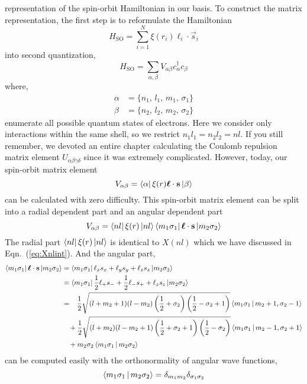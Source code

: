 representation of the spin-orbit Hamiltonian in our basis.
To construct the matrix representation, the first step is to reformulate the Hamiltonian
\begin{equation}
H_\text{SO} = \sum_{i=1}^N \xi(r_i) \boldsymbol{\ell}_i\cdot\vec{s}_i
\end{equation}
into second quantization,
\begin{equation} \label{eq:SO2nd}
H_\text{SO} = \sum_{\alpha,\beta} V_{\alpha\beta} c_\alpha^\dagger c_\beta
\end{equation}
where,
\begin{align*}
\alpha & = \{n_1,\,l_1,\,m_1,\,\sigma_1\} \\
\beta  & = \{n_2,\,l_2,\,m_2,\,\sigma_2\}
\end{align*}
enumerate all possible quantum states of electrons. Here we consider only
interactions within the same shell, so we restrict $n_1l_1=n_2l_2=nl$.
If you still remember, we devoted an entire chapter
calculating the Coulomb repulsion matrix element $U_{\alpha\beta\gamma\delta}$
since it was extremely complicated.
However, today, our spin-orbit matrix element
\begin{equation}
V_{\alpha\beta} = \Bra{\alpha} \xi(r) \boldsymbol{\ell}\cdot\vec{s} \Ket{\beta}
\end{equation}
can be calculated with zero difficulty.
This spin-orbit matrix element can be split into a radial dependent part
and an angular dependent part
\begin{equation}
V_{\alpha\beta} = \Bra{nl} \xi(r) \Ket{nl} \Bra{m_1\sigma_1} \boldsymbol{\ell}\cdot\vec{s} \Ket{m_2\sigma_2}
\end{equation}
%
The radial part $\Bra{nl}\xi(r)\Ket{nl}$ is identical to $X(nl)$
which we have discussed in Eqn.~(\ref{eq:Xnlint}). And the angular part,
\begin{align} \label{eq:AngularSO}
\Bra{m_1\sigma_1} \boldsymbol{\ell}\cdot\vec{s} \Ket{m_2\sigma_2}
& = \Bra{m_1\sigma_1} \ell_x s_x + \ell_y s_y + \ell_z s_z \Ket{m_2\sigma_2} \nonumber \\
& = \Bra{m_1\sigma_1} \frac{1}{2}\ell_+ s_- + \frac{1}{2}\ell_- s_+ + \ell_z s_z \Ket{m_2\sigma_2} \nonumber \\
& = \phantom{+} \frac{1}{2}\sqrt{(l+m_2+1)(l-m_2)\left(\frac{1}{2}+\sigma_2\right)\left(\frac{1}{2}-\sigma_2+1\right)} \Braket{m_1\sigma_1|m_2+1,\sigma_2-1} \nonumber \\
& \phantom{=}\, + \frac{1}{2}\sqrt{(l+m_2)(l-m_2+1)\left(\frac{1}{2}+\sigma_2+1\right)\left(\frac{1}{2}-\sigma_2\right)} \Braket{m_1\sigma_1|m_2-1,\sigma_2+1} \nonumber \\
& \phantom{=}\, + m_2\sigma_2\Braket{m_1\sigma_1|m_2\sigma_2}
\end{align}
can be computed easily with the orthonormality of angular wave functions,
\begin{equation}
\Braket{m_1\sigma_1|m_2\sigma_2} = \delta_{m_1m_2}\delta_{\sigma_1\sigma_2}
\end{equation}

